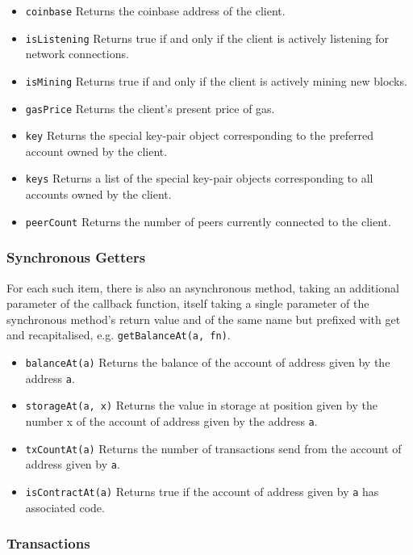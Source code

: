 \begin{itemize}
\item \texttt{coinbase} Returns the coinbase address of the client.
\item \texttt{isListening} Returns true if and only if the client is actively listening for network connections.
\item \texttt{isMining} Returns true if and only if the client is actively mining new blocks.
\item \texttt{gasPrice} Returns the client's present price of gas.
\item \texttt{key} Returns the special key-pair object corresponding to the preferred account owned by the client.
\item \texttt{keys} Returns a list of the special key-pair objects corresponding to all accounts owned by the client.
\item \texttt{peerCount} Returns the number of peers currently connected to the client.
\end{itemize}

\subsubsection{Synchronous Getters}
For each such item, there is also an asynchronous method, taking an additional parameter of the callback function, itself taking a single parameter of the synchronous method's return value and of the same name but prefixed with get and recapitalised, e.g. \texttt{getBalanceAt(a, fn)}.

\begin{itemize}
\item \texttt{balanceAt(a)} Returns the balance of the account of address given by the address \texttt{a}.
\item \texttt{storageAt(a, x)} Returns the value in storage at position given by the number x of the account of address given by the address \texttt{a}.
\item \texttt{txCountAt(a)} Returns the number of transactions send from the account of address given by \texttt{a}.
\item \texttt{isContractAt(a)} Returns true if the account of address given by \texttt{a} has associated code.
\end{itemize}

\subsubsection{Transactions}

